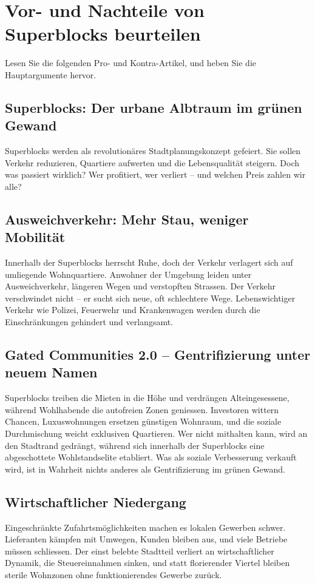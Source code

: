 \section{Vor- und Nachteile von Superblocks beurteilen}
\label{subsec:beurteilen}
Lesen Sie die folgenden Pro- und Kontra-Artikel, und heben Sie die Hauptargumente hervor.
\newpage
\begin{tcolorbox}[title=Kontra-Argumente,
			parbox=false,
			colback=Crimson!10,
			colframe=Crimson,
			colbacktitle=Crimson]
\section*{Superblocks: Der urbane Albtraum im grünen Gewand}
Superblocks werden als revolutionäres Stadtplanungskonzept gefeiert. Sie sollen Verkehr reduzieren, Quartiere aufwerten und die Lebensqualität steigern. Doch was passiert wirklich? Wer profitiert, wer verliert -- und welchen Preis zahlen wir alle?

\subsection*{Ausweichverkehr: Mehr Stau, weniger Mobilität}

Innerhalb der Superblocks herrscht Ruhe, doch der Verkehr verlagert sich auf umliegende Wohnquartiere. Anwohner der Umgebung leiden unter Ausweichverkehr, längeren Wegen und verstopften Strassen. Der Verkehr verschwindet nicht -- er sucht sich neue, oft schlechtere Wege. Lebenswichtiger Verkehr wie Polizei, Feuerwehr und Krankenwagen werden durch die Einschränkungen gehindert und verlangsamt.

\subsection*{Gated Communities 2.0 -- Gentrifizierung unter neuem Namen}
Superblocks treiben die Mieten in die Höhe und verdrängen Alteingesessene, während Wohlhabende die autofreien Zonen geniessen. Investoren wittern Chancen, Luxuswohnungen ersetzen günstigen Wohnraum, und die soziale Durchmischung weicht exklusiven Quartieren. Wer nicht mithalten kann, wird an den Stadtrand gedrängt, während sich innerhalb der Superblocks eine abgeschottete Wohlstandselite etabliert. Was als soziale Verbesserung verkauft wird, ist in Wahrheit nichts anderes als Gentrifizierung im grünen Gewand.

\subsection*{Wirtschaftlicher Niedergang}
Eingeschränkte Zufahrtsmöglichkeiten machen es lokalen Gewerben schwer. Lieferanten kämpfen mit Umwegen, Kunden bleiben aus, und viele Betriebe müssen schliessen. Der einst belebte Stadtteil verliert an wirtschaftlicher Dynamik, die Steuereinnahmen sinken, und statt florierender Viertel bleiben sterile Wohnzonen ohne funktionierendes Gewerbe zurück.


\end{tcolorbox}

